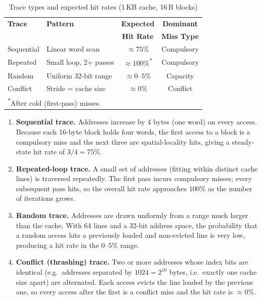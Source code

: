 \begin{table}[t]
\centering
\caption{Trace types and expected hit rates (1\,KB cache, 16\,B blocks)}
\label{tab:traces}
\begin{tabular}{llcc}
\hline
\textbf{Trace} & \textbf{Pattern} & \textbf{Expected} & \textbf{Dominant}\\
               &                  & \textbf{Hit Rate}  & \textbf{Miss Type}\\
\hline
Sequential  & Linear word scan       & $\approx 75\%$ & Compulsory \\
Repeated    & Small loop, 2+ passes  & $\approx 100\%$\textsuperscript{*} & Compulsory \\
Random      & Uniform 32-bit range   & $\approx 0$--$5\%$ & Capacity \\
Conflict    & Stride = cache size    & $\approx 0\%$ & Conflict \\
\hline
\multicolumn{4}{l}{\footnotesize\textsuperscript{*}After cold (first-pass) misses.}
\end{tabular}
\end{table}

\begin{enumerate}
  \item \textbf{Sequential trace.}  Addresses increase by 4 bytes (one
        word) on every access.  Because each 16-byte block holds four
        words, the first access to a block is a compulsory miss and the
        next three are spatial-locality hits, giving a steady-state hit
        rate of $3/4 = 75\%$.

  \item \textbf{Repeated-loop trace.}  A small set of addresses (fitting
        within distinct cache lines) is traversed repeatedly.  The first
        pass incurs compulsory misses; every subsequent pass hits, so the
        overall hit rate approaches $100\%$ as the number of iterations
        grows.

  \item \textbf{Random trace.}  Addresses are drawn uniformly from a range
        much larger than the cache.  With 64 lines and a 32-bit address
        space, the probability that a random access hits a previously
        loaded and non-evicted line is very low, producing a hit rate in
        the $0$--$5\%$ range.

  \item \textbf{Conflict (thrashing) trace.}  Two or more addresses whose
        index bits are identical (e.g.\ addresses separated by
        $1024 = 2^{10}$ bytes, i.e.\ exactly one cache size apart) are
        alternated.  Each access evicts the line loaded by the previous
        one, so every access after the first is a conflict miss and the
        hit rate is $\approx 0\%$.
\end{enumerate}

